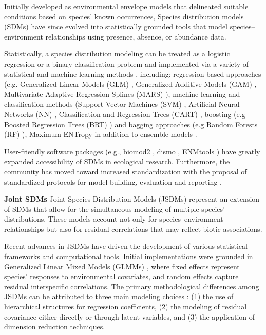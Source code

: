 Initially developed as environmental envelope models that delineated suitable conditions based on species’ known occurrences, Species distribution models (SDMs) have since evolved into statistically grounded tools that model species–environment relationships using presence, absence, or abundance data. 

Statistically, a species distribution modeling can be treated as a logistic regression or a binary classification problem and implemented via a variety of statistical and machine learning methods \cite{guisan2017habitat}, including: regression based approaches (e.g. Generalized Linear Models (GLM) \cite{nelder1972generalized}, Generalized Additive Models (GAM) \cite{hastie1986generalized}, Multivariate Adaptive Regression
Splines (MARS) \cite{friedman1991multivariate}), machine learning and classification methods (Support Vector
Machines (SVM) \cite{hearst1998support}, Artificial Neural Networks (NN) \cite{lecun2015deep}, Classification
and Regression Trees (CART) \cite{breiman2017classification}, boosting (e.g Boosted Regression Trees (BRT) \cite{elith2008working}) and bagging approaches (e.g Random Forests (RF) \cite{breiman2001random}), Maximum ENTropy \cite{phillips2017opening} in addition to ensemble models \cite{thuiller2009biomod}. 

User-friendly software packages (e.g., biomod2 \cite{thuiller2009biomod}, dismo \cite{hijmans2017package}, ENMtools \cite{warren2010enmtools}) have greatly expanded accessibility of SDMs in ecological research. Furthermore, the community has moved toward increased standardization with the proposal of standardized protocols for model building, evaluation \cite{roberts2017cross,valavi2018blockcv} and reporting \cite{fitzpatrick2021odmap,zurell2020standard}. 


\noindent\textbf{Joint SDMs}
Joint Species Distribution Models (JSDMs) \cite{pollock2014understanding} represent an extension of SDMs that allow for the simultaneous modeling of multiple species’ distributions. These models account not only for species–environment relationships but also for residual correlations that may reflect biotic associations.

Recent advances in JSDMs have driven the development of various statistical frameworks and computational tools. Initial implementations were grounded in Generalized Linear Mixed Models (GLMMs) \cite{pollock2014understanding,ovaskainen2020joint,warton2015so}, where fixed effects represent species’ responses to environmental covariates, and random effects capture residual interspecific correlations. The primary methodological differences among JSDMs can be attributed to three main modeling choices \cite{wilkinson2019comparison}: (1) the use of hierarchical structures for regression coefficients, (2) the modeling of residual covariance either directly or through latent variables, and (3) the application of dimension reduction techniques.

